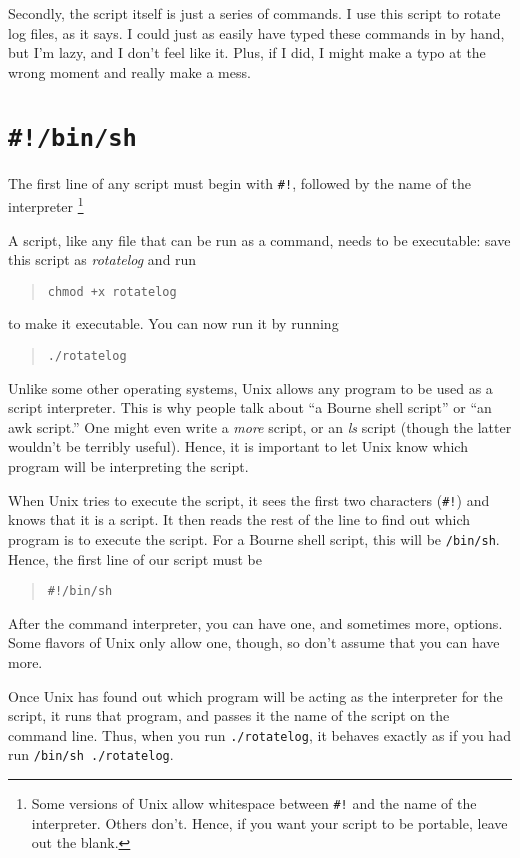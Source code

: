 \documentclass{article}
\newcommand{\fname}[1]{\textsl{#1}}
\newcommand{\cmd}[1]{\textit{#1}}
\newcommand{\code}[1]{\texttt{#1}}
\begin{document}
	Secondly, the script itself is just a series of commands. I
use this script to rotate log files, as it says. I could just as
easily have typed these commands in by hand, but I'm lazy, and I don't
feel like it. Plus, if I did, I might make a typo at the wrong moment
and really make a mess.

\section{\code{\#!/bin/sh}}

	The first line of any script must begin with \code{\#!},
followed by the name of the interpreter%
\footnote{Some versions of Unix allow whitespace between \code{\#!}
and the name of the interpreter. Others don't. Hence, if you want your
script to be portable, leave out the blank.}

	A script, like any file that can be run as a command, needs to
be executable: save this script as \fname{rotatelog} and run
\begin{quote}
\code{chmod +x rotatelog}
\end{quote}
to make it executable. You can now run it by running
\begin{quote}
\code{./rotatelog}
\end{quote}

	Unlike some other operating systems, Unix allows any program
to be used as a script interpreter. This is why people talk about ``a
Bourne shell script'' or ``an awk script.'' One might even write a
\cmd{more} script, or an \cmd{ls} script (though the latter
wouldn't be terribly useful). Hence, it is important to let Unix know
which program will be interpreting the script.

	When Unix tries to execute the script, it sees the first two
characters (\code{\#!}) and knows that it is a script. It then reads
the rest of the line to find out which program is to execute the
script. For a Bourne shell script, this will be \code{/bin/sh}. Hence,
the first line of our script must be

\begin{quote}
\code{\#!/bin/sh}
\end{quote}

	After the command interpreter, you can have one, and sometimes
more, options. Some flavors of Unix only allow one, though, so don't
assume that you can have more.

	\label{os-script}Once Unix has found out which program will be
acting as the interpreter for the script, it runs that program, and
passes it the name of the script on the command line. Thus, when you
run \code{./rotatelog}, it behaves exactly as if you had run
\code{/bin/sh ./rotatelog}.
\end{document}
